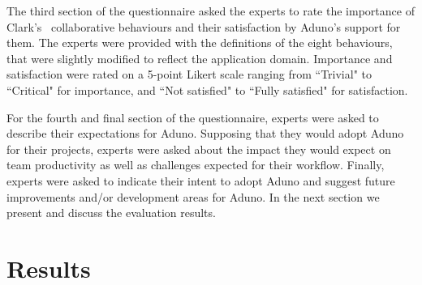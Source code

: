 \documentclass[conference]{IEEEtran}
\begin{document}
The third section of the questionnaire asked the experts to rate the importance of Clark's~\cite{Clark96} collaborative behaviours and their satisfaction by Aduno's support for them. The experts were provided with the definitions of the eight behaviours, that were slightly modified to reflect the application domain. Importance and satisfaction were rated on a 5-point Likert scale ranging from ``Trivial" to ``Critical" for importance, and ``Not satisfied" to ``Fully satisfied" for satisfaction. 

For the fourth and final section of the questionnaire, experts were asked to describe their expectations for Aduno. Supposing that they would adopt Aduno for their projects, experts were asked about the impact they would expect on team productivity as well as challenges expected for their workflow. Finally, experts were asked to indicate their intent to adopt Aduno and suggest future improvements and/or development areas for Aduno. In the next section we present and discuss the evaluation results.

\section{Results}
\label{sec:results}
\end{document}
